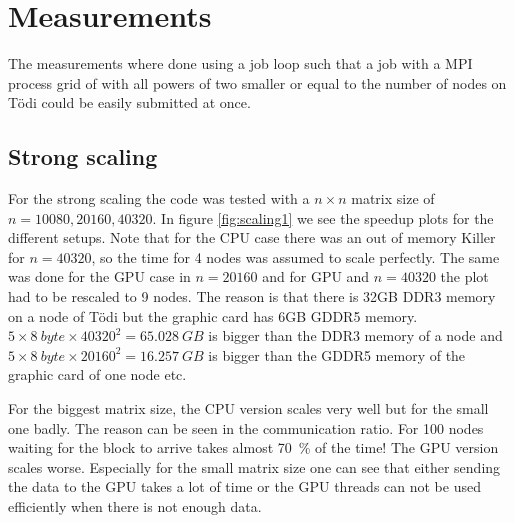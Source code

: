 \section{Measurements}
The measurements where done using a job loop such that a job with a MPI process grid of with all powers of two smaller or equal to the number of nodes on Tödi could be easily submitted at once.
\subsection{Strong scaling}
For the strong scaling the code was tested with a $n\times n$ matrix size of $n=10080, 20160, 40320$. In figure \ref{fig:scaling1} we see the speedup plots for the different setups. Note that for the CPU case there was an out of memory Killer for $n=40320$, so the time for 4 nodes was assumed to scale perfectly. The same was done for the GPU case in $n = 20160$ and for GPU and $n=40320$ the plot had to be rescaled to 9 nodes. The reason is that there is 32GB DDR3 memory on a node of Tödi but the graphic card has 6GB GDDR5 memory. $5\times \SI{8}{byte}\times 40320^2=\SI{65.028}{GB}$ is bigger than the DDR3 memory of a node and $5\times \SI{8}{byte}\times 20160^2=\SI{16.257}{GB}$ is bigger than the GDDR5 memory of the graphic card of one node etc.

For the biggest matrix size, the CPU version scales very well but for the small one badly. The reason can be seen in the communication ratio. For 100 nodes waiting for the block to arrive takes almost \SI{70}{\percent} of the time! The GPU version scales worse. Especially for the small matrix size one can see that either sending the data to the GPU takes a lot of time or the GPU threads can not be used efficiently when there is not enough data.

